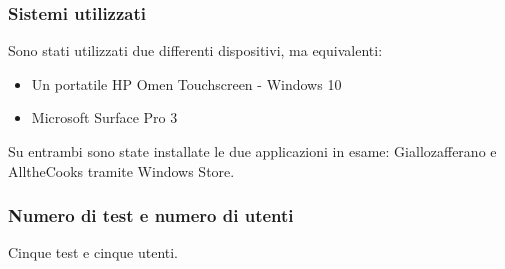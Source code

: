 \subsubsection*{Sistemi utilizzati}
Sono stati utilizzati due differenti dispositivi, ma equivalenti:
\begin{itemize}
\item Un portatile HP Omen Touchscreen - Windows 10
\item Microsoft Surface Pro 3
\end{itemize}
Su entrambi sono state installate le due applicazioni in esame: Giallozafferano e AlltheCooks tramite Windows Store.

\subsubsection*{Numero di test e numero di utenti}
Cinque test e cinque utenti.

